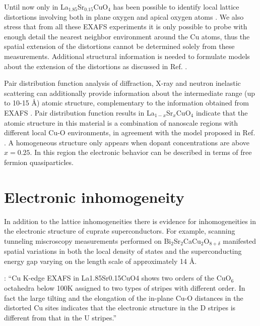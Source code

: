 Until now only in La$_{1.85}$Sr$_{0.15}$CuO$_{4}$ has been possible to identify local lattice distortions involving both in plane oxygen and apical oxygen atoms  \cite{Bianconi1996}. 
We also stress that from all these EXAFS experiments it is only possible to probe with enough detail the nearest neighbor environment around the Cu atoms, thus the spatial extension of the distortions cannot be determined solely from these measurements. 
Additional structural information \cite{Bianconi1996a} is needed to formulate models about the extension of the distortions as discussed in Ref. \cite{Bianconi1996}.

Pair distribution function analysis of diffraction, X-ray and neutron inelastic scattering can additionally provide information about the intermediate range (up to 10-15 \AA) atomic structure, complementary to the information obtained from EXAFS \cite{Egami2003}. 
Pair distribution function results in La$_{1-x}$Sr$_{x}$CuO$_{4}$ \cite{Bozin1999,Bozin2000} indicate that the atomic structure in this material is a combination of nanoscale regions with different local Cu-O environments, in agreement with the model proposed in Ref. \cite{Bianconi1996}. 
A homogeneous structure only appears when dopant concentrations are above $x = 0.25$. 
In this region the electronic behavior can be described in terms of free fermion quasiparticles.


\section{Electronic inhomogeneity}
\label{sec:electronicInhomogeneity}

In addition to the lattice inhomogeneities there is evidence for inhomogeneities in the electronic structure of cuprate superconductors.
For example, scanning tunneling miscroscopy measurements performed on Bi$_2$Sr$_2$CaCu$_2$O$_{8+\delta}$ manifested spatial variations in both the local density of states and the superconducting energy gap varying on the length scale of approximately 14 \AA \cite{Pan2001}. 

\cite{Bianconi1996}: ``Cu K-edge EXAFS in La1.85Sr0.15CuO4 shows two orders of the CuO$_6$ octahedra below 100K assigned to two types of stripes with different order. In fact the large tilting and the elongation of the in-plane Cu-O distances in the distorted Cu sites indicates that the electronic structure in the D stripes is different from that in the U stripes.''

